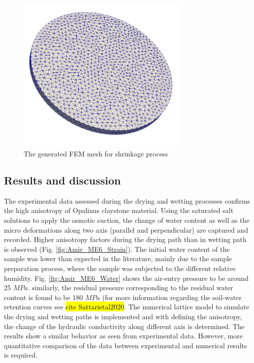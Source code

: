 \begin{figure}[!ht]
\centering
\includegraphics[width=0.75\textwidth]{figures/ME5_VPF_mesh.png}
\caption{The generated FEM mesh for shrinkage process}
\label{fig:ME5_VPF_setup}
\end{figure} 
\subsection{Results and discussion}

The experimental data assessed during the drying and wetting processes confirms the high anisotropy of Opalinus claystone material. Using the saturated salt solutions to apply the osmotic suction, the change of water content as well as the micro deformations along two axis (parallel and perpendicular) are captured and recorded. Higher anisotropy factors during the drying path than in wetting path is observed (Fig. \ref{fig:Amir_ME6_Strain}). The initial water content of the sample was lower than expected in the literature, mainly due to the sample preparation process, where the sample was subjected to the different relative humidity. Fig. \ref{fig:Amir_ME6_Water} shows the air-entry pressure to be around 25 $MPa$. similarly, the residual pressure corresponding to the residual water content is found to be 180 $MPa$ (for more information regarding the soil-water retention curves see \hl{cite Sattarietal2020}. The numerical lattice model to simulate the drying and wetting paths is implemented and with defining the anisotropy, the change of the hydraulic conductivity along different axis is determined. The results show a similar behavior as seen from experimental data. However, more quantitative comparison of the data between experimental and numerical results is required. 